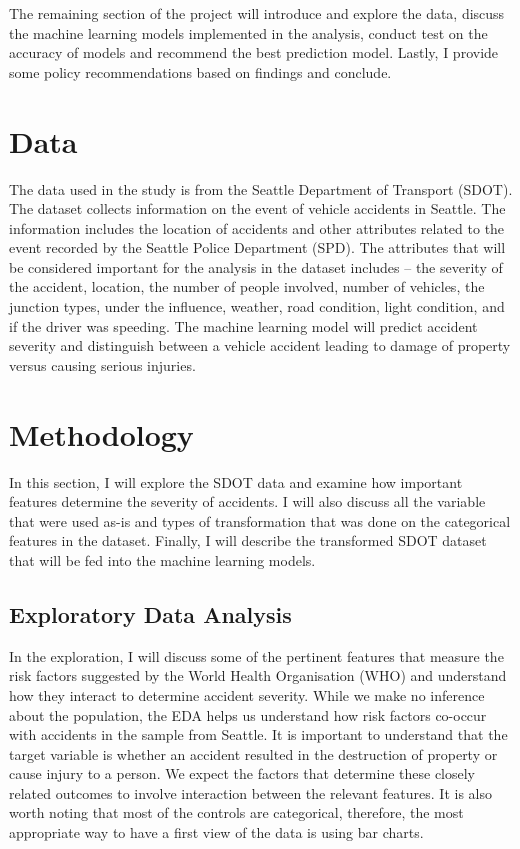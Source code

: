 \documentclass[a4paper,12pt]{article}
\begin{document}
The remaining section of the project will introduce and explore the data, discuss the machine learning models implemented in the analysis, conduct test on the accuracy of models and recommend the best prediction model. Lastly, I provide some policy recommendations based on findings and conclude.

\section{Data}
The data used in the study is from the Seattle Department of Transport (SDOT). The dataset collects information on the event of vehicle accidents in Seattle. The information includes the location of accidents and other attributes related to the event recorded by the Seattle Police Department (SPD). The attributes that will be considered important for the analysis in the dataset includes – the severity of the accident, location, the number of people involved, number of vehicles, the junction types, under the influence, weather, road condition, light condition, and if the driver was speeding. The machine learning model will predict accident severity and distinguish between a vehicle accident leading to damage of property versus causing serious injuries.

\newpage
\section{Methodology}
In this section, I will explore the SDOT data and examine how important features determine the severity of accidents. I will also discuss all the variable that were used as-is and types of transformation that was done on the categorical features in the dataset. Finally, I will describe the transformed SDOT dataset that will be fed into the machine learning models.

\subsection{Exploratory Data Analysis}
In the exploration, I will discuss some of the pertinent features that measure the risk factors suggested by the World Health Organisation (WHO) and understand how they interact to determine accident severity. While we make no inference about the population, the EDA helps us understand how risk factors co-occur with accidents in the sample from Seattle. It is important to understand that the target variable is whether an accident resulted in the destruction of property or cause injury to a person. We expect the factors that determine these closely related outcomes to involve interaction between the relevant features. It is also worth noting that most of the controls are categorical, therefore, the most appropriate way to have a first view of the data is using bar charts.\\
\end{document}
